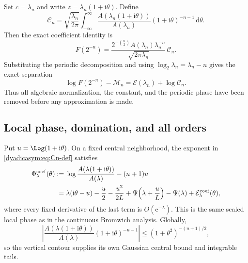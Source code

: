 \documentclass[11pt,oneside]{article}
\theoremstyle{definition}
\theoremstyle{remark}
\newcommand{\e}{\mathrm e}
\newcommand{\ii}{\mathrm i}
\newcommand{\dd}{\,\mathrm d}
\begin{document}
Set $c=\lambda_n$ and write $z=\lambda_n(1+\ii\theta)$.  Define
\begin{equation}
 \mathcal C_n=\sqrt{\frac{\lambda_n}{2\pi}}
 \int_{-\infty}^{\infty}
 \frac{A(\lambda_n(1+\ii\theta))}{A(\lambda_n)}
 (1+\ii\theta)^{-n-1}\dd\theta.                           \label{dyadicasym:eq:Cn-def}
\end{equation}
Then the exact coefficient identity is
\begin{equation}
 F(2^{-n})=
 \frac{2^{-\binom n2}A(\lambda_n)\lambda_n^{-n}}
 {\sqrt{2\pi\lambda_n}}\,\mathcal C_n.                   \label{dyadicasym:eq:exact-coefficient-saddle}
\end{equation}
Substituting the periodic decomposition and using
$\log_2\lambda_n=\lambda_n-n$ gives the exact separation
\begin{equation}
 \boxed{\log F(2^{-n})-\mathcal M_n
 =\mathcal E(\lambda_n)+\log\mathcal C_n.}                \label{dyadicasym:eq:exact-dyadic-separation}
\end{equation}
Thus all algebraic normalization, the constant, and the periodic phase have been removed
before any approximation is made.

\subsection{Local phase, domination, and all orders}

Put $u=\Log(1+\ii\theta)$.  On a fixed central neighborhood, the exponent in
\eqref{dyadicasym:eq:Cn-def} satisfies
\begin{align}
 \Phi_{\lambda}^{\mathrm{coef}}(\theta)
 :={}&\log\frac{A(\lambda(1+\ii\theta))}{A(\lambda)}-(n+1)u\notag\\
 ={}&\lambda(\ii\theta-u)-\frac u2-\frac{u^2}{2L}
 +\Psi\!\left(\lambda+\frac uL\right)-\Psi(\lambda)
 +\mathcal E_{\lambda}^{\mathrm{coef}}(\theta),           \label{dyadicasym:eq:coefficient-local-phase}
\end{align}
where every fixed derivative of the last term is $O(\e^{-\lambda})$.  This is the same
scaled local phase as in the continuous Bromwich analysis.  Globally,
\begin{equation}
 \left|\frac{A(\lambda(1+\ii\theta))}{A(\lambda)}
 (1+\ii\theta)^{-n-1}\right|
 \le(1+\theta^2)^{-(n+1)/2},                              \label{dyadicasym:eq:coefficient-tail-bound}
\end{equation}
so the vertical contour supplies its own Gaussian central bound and integrable tails.
\end{document}
